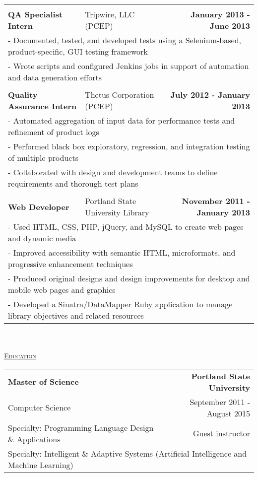 \documentclass[letterpaper]{article}
\begin{document}
\begin{center}
\begin{tabular}{p{}p{}r}
			\\
			\\
				\textbf{QA Specialist Intern}					&
				Tripwire, LLC (PCEP)							&
				\textbf{January 2013 - June 2013}
			\\
				\multicolumn{3}{p{\textwidth}}{\quad\quad - Documented, tested, and developed tests using a Selenium-based, product-specific, GUI testing framework}
			\\
				\multicolumn{3}{p{\textwidth}}{\quad\quad - Wrote scripts and configured Jenkins jobs in support of automation and data generation efforts} 
			\\
			\\
				\textbf{Quality Assurance Intern}					&
				Thetus Corporation (PCEP)							&
				\textbf{July 2012 - January 2013}
			\\
				\multicolumn{3}{p{\textwidth}}{\quad\quad - Automated aggregation of input data for performance tests and refinement of product logs}
			\\
				\multicolumn{3}{p{\textwidth}}{\quad\quad - Performed black box exploratory, regression, and integration testing of multiple products} 
			\\
				\multicolumn{3}{p{\textwidth}}{\quad\quad - Collaborated with design and development teams to define requirements and thorough test plans}
			\\
			\\
				\textbf{Web Developer}						&
				Portland State University Library					&
				\textbf{November 2011 - January 2013}
			\\
				\multicolumn{3}{p{\textwidth}}{\quad\quad - Used HTML, CSS, PHP, jQuery, and MySQL to create web pages and dynamic media} 
			\\
				\multicolumn{3}{p{\textwidth}}{\quad\quad - Improved accessibility with semantic HTML, microformats, and progressive enhancement techniques} 
			\\
				\multicolumn{3}{p{\textwidth}}{\quad\quad - Produced original designs and design improvements for desktop and mobile web pages and graphics} 
			\\
				\multicolumn{3}{p{\textwidth}}{\quad\quad - Developed a Sinatra/DataMapper Ruby application to manage library objectives and related resources} 
		\end{tabular} \\
		\vspace{1in} \\
		\underline{\large \scshape Education}
		\begin{tabular}{p{}r}
				\textbf{Master of Science}							&
				\textbf{Portland State University}
			\\
				Computer Science\quad				&
				September 2011 - August 2015
			\\
				Specialty: Programming Language Design \& Applications		&		Guest instructor
			\\	
				\multicolumn{2}{p{\textwidth}}{Specialty: Intelligent \& Adaptive Systems (Artificial Intelligence and Machine Learning)}
				

\end{tabular}
\end{center}
\end{document}
